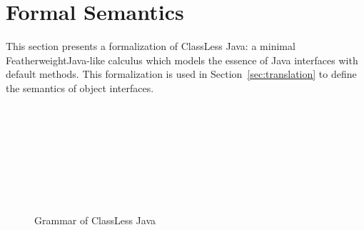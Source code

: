 


\section{Formal Semantics}\label{sec:formal}

This section presents a formalization of ClassLess Java: a minimal
FeatherweightJava-like calculus which models the essence of Java
interfaces with default methods. This formalization is used in
Section~\ref{sec:translation} to define the semantics of object interfaces.


\begin{figure}[t]
\begin{grammar}
\\
\\
\\
\\
\\
\\
\\
\end{grammar}
\caption{Grammar of ClassLess Java}
\label{Grammar}
\end{figure}

